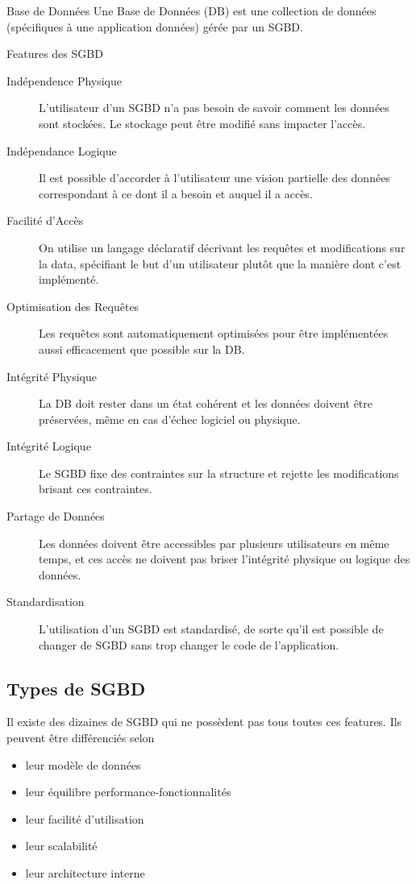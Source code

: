 \documentclass{cours}
\begin{document}
\begin{définition}{Base de Données}{}
    Une Base de Données (DB) est une collection de données (spécifiques à une application données) gérée par un SGBD.
\end{définition}

\begin{propositionfr}{Features des SGBD}{}
    \begin{description}
        \item[Indépendence Physique] L'utilisateur d'un SGBD n'a pas besoin de savoir comment les données sont stockées. Le stockage peut être modifié sans impacter l'accès.  
        \item[Indépendance Logique] Il est possible d'accorder à l'utilisateur une vision partielle des données correspondant à ce dont il a besoin et auquel il a accès.
        \item[Facilité d'Accès] On utilise un langage déclaratif  décrivant les requêtes et modifications sur la data, spécifiant le but d'un utilisateur plutôt que la manière dont c'est implémenté.
        \item[Optimisation des Requêtes] Les requêtes sont automatiquement optimisées pour être implémentées aussi efficacement que possible sur la DB. 
        \item[Intégrité Physique] La DB doit rester dans un état cohérent et les données doivent être préservées, même en cas d'échec logiciel ou physique.
        \item[Intégrité Logique] Le SGBD fixe des contraintes sur la structure et rejette les modifications brisant ces contraintes.
        \item[Partage de Données] Les données doivent être accessibles par plusieurs utilisateurs en même temps, et ces accès ne doivent pas briser l'intégrité physique ou logique des données.   
        \item[Standardisation] L'utilisation d'un SGBD est standardisé, de sorte qu'il est possible de changer de SGBD sans trop changer le code de l'application.
    \end{description}
\end{propositionfr}

\subsection{Types de SGBD}
Il existe des dizaines de SGBD qui ne possèdent pas tous toutes ces features. Ils peuvent être différenciés selon 
\begin{itemize}
    \item leur modèle de données
    \item leur équilibre performance-fonctionnalités
    \item leur facilité d'utilisation 
    \item leur scalabilité
    \item leur architecture interne
\end{itemize}
\end{document}
